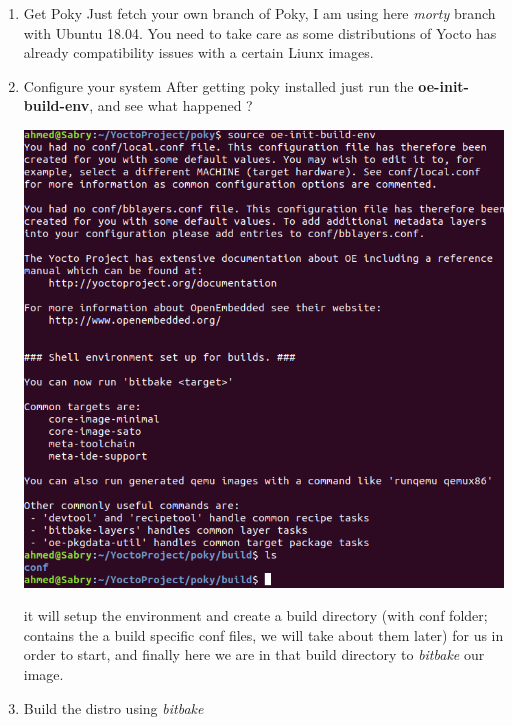 \documentclass{article}
\begin{document}
\begin{enumerate}
  \item Get Poky
  Just fetch your own branch of Poky, I am using here \textit{morty} branch with Ubuntu 18.04. You need to take care as some distributions of Yocto has already compatibility issues with a certain Liunx images.
  
  
  \item Configure your system
  After getting poky installed just run the \textbf{oe-init-build-env}, and see what happened ?\\
  
  
  \begin{center}
  \includegraphics[scale=0.60]{./resources/img/init-env-script.png}
  \end{center}
  it will setup the environment and create a build directory (with conf folder; contains the a build specific conf files, we will take about them later) for us in order to start, and finally here we are in that build directory to \textit{bitbake} our image.
  
\item Build the distro using \textit{bitbake}\\



\end{enumerate}
\end{document}
